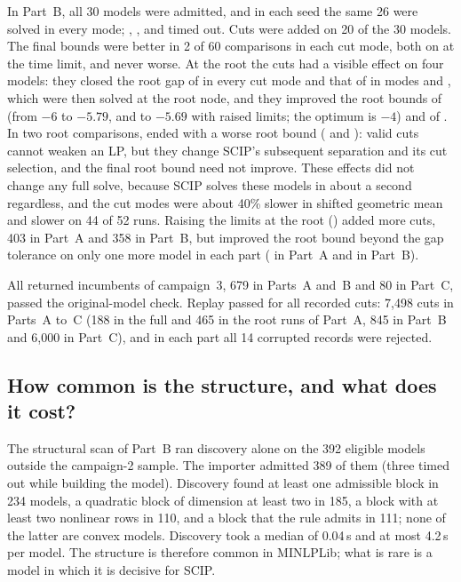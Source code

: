 In Part~B, all 30 models were admitted, and in each seed the same 26 were
solved in every mode; , , 
and  timed out. Cuts were added on 20 of the 30
models. The final bounds were better in 2 of 60 comparisons in each cut
mode, both on  at the time limit, and never worse.
At the root the cuts had a visible effect on four models: they closed the
root gap of  in every cut mode and that of
 in modes  and , which
were then solved at the root node, and
they improved the root bounds of  (from $-6$ to $-5.79$,
and to $-5.69$ with raised limits; the optimum is $-4$) and of
. In two root comparisons,  ended with a worse
root bound ( and ): valid cuts
cannot weaken an LP, but they change SCIP's subsequent separation and its
cut selection, and the final root bound need not improve. These effects did
not change any full solve, because SCIP solves these models in about a
second regardless, and the cut modes were about 40\% slower in shifted
geometric mean and slower on 44 of 52 runs. Raising the limits at the root
() added more cuts, 403 in Part~A and 358 in Part~B, but
improved the root bound beyond the gap tolerance on only one more model in
each part ( in Part~A and 
in Part~B).

All returned incumbents of campaign~3, 679 in Parts~A and~B and 80 in
Part~C, passed the original-model check. Replay passed for all recorded
cuts: 7{,}498 cuts in Parts~A to~C (188 in the full and 465 in the root runs of
Part~A, 845 in Part~B and 6{,}000 in Part~C), and in each part all 14
corrupted records were rejected.

\subsection{How common is the structure, and what does it cost?}\label{sec:coverage}

The structural scan of Part~B ran discovery alone on the 392 eligible
models outside the campaign-2 sample. The importer admitted 389 of them
(three timed out while building the model). Discovery found at least one
admissible block in 234 models, a quadratic block of dimension at least two
in 185, a block with at least two nonlinear rows in 110, and a block that
the  rule admits in 111; none of the latter are convex models.
Discovery took a median of 0.04\,s and at most 4.2\,s per model. The
structure is therefore common in MINLPLib; what is rare is a model in which
it is decisive for SCIP.

